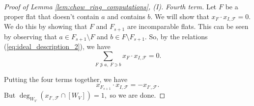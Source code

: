 \documentclass[10pt,a4paper]{amsart}
\begin{document}
\begin{proof}[Proof of Lemma \ref{lem:chow_ring_computations}, (I)]
\noindent
\textit{Fourth term.} Let $F$ be a proper flat that doesn't contain $a$ and contains $b$. We will show that $x_F \cdot x_{I, \mathscr{F}} = 0$. We do this by showing that $F$ and $F_{s+1}$ are incomparable flats. This can be seen by observing that $a \in F_{s+1} \setminus F$ and $b \in F \setminus F_{s+1}$. So, by the relations (\ref{eq:ideal_description_2}), we have
\begin{equation*}
\sum_{F \not\ni a,\: F \ni b}x_F \cdot x_{I,\mathscr{F}} = 0.
\end{equation*}

Putting the four terms together, we have
\begin{equation*}
x_{F_{s+1}} \cdot x_{I ,\mathscr{F}} = -x_{I' , \mathscr{F}}.
\end{equation*}
But $\deg_{W_V}(x_{I' , \mathscr{F}} \cap [W_V]) = 1,$ so we are done.
\end{proof}
\end{document}
